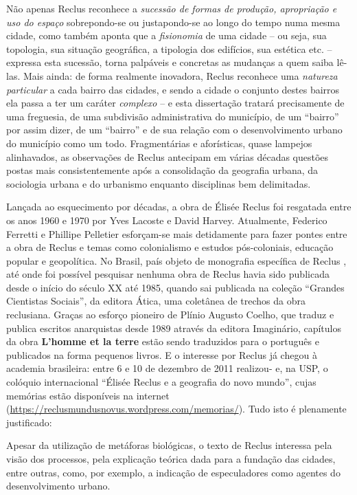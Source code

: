 Não apenas Reclus reconhece a \textit{sucessão de formas de produção, apropriação e uso do espaço} sobrepondo-se ou justapondo-se ao longo do tempo numa mesma cidade, como também aponta que a \textit{fisionomia} de uma cidade -- ou seja, sua topologia, sua situação geográfica, a tipologia dos edifícios, sua estética etc. -- expressa esta sucessão, torna palpáveis e concretas as mudanças a quem saiba lê-las. Mais ainda: de forma realmente inovadora, Reclus reconhece uma \textit{natureza particular} a cada bairro das cidades, e sendo a cidade o conjunto destes bairros ela passa a ter um caráter \textit{complexo} -- e esta dissertação tratará precisamente de uma freguesia, de uma subdivisão administrativa do município, de um ``bairro'' por assim dizer, de um ``bairro'' e de sua relação com o desenvolvimento urbano do município como um todo. Fragmentárias e aforísticas, quase lampejos alinhavados, as observações de Reclus antecipam em várias décadas questões postas mais consistentemente após a consolidação da geografia urbana, da sociologia urbana e do urbanismo enquanto disciplinas bem delimitadas.

Lançada ao esquecimento por décadas, a obra de Élisée Reclus foi resgatada entre os anos 1960 e 1970 por Yves Lacoste e David Harvey. Atualmente, Federico Ferretti e Phillipe Pelletier esforçam-se mais detidamente para fazer pontes entre a obra de Reclus e temas como colonialismo e estudos pós-coloniais, educação popular e geopolítica. No Brasil, país objeto de monografia específica de Reclus \cite{RECLUS1900}, até onde foi possível pesquisar nenhuma obra de Reclus havia sido publicada desde o início do século XX até 1985, quando sai publicada na coleção ``Grandes Cientistas Sociais'', da editora Ática, uma coletânea de trechos da obra reclusiana. Graças ao esforço pioneiro de Plínio Augusto Coelho, que traduz e publica escritos anarquistas desde 1989 através da editora Imaginário, capítulos da obra \textbf{L'homme et la terre }estão sendo traduzidos para o português e publicados na forma pequenos livros. E o interesse por Reclus já chegou à academia brasileira: entre 6 e 10 de dezembro de 2011 realizou- e, na USP, o colóquio internacional ``Élisée Reclus e a geografia do novo mundo'', cujas memórias estão disponíveis na internet (\url{https://reclusmundusnovus.wordpress.com/memorias/}). Tudo isto é plenamente justificado:

\begin{citacao}
Apesar da utilização de metáforas biológicas, o texto de Reclus interessa pela visão dos processos, pela explicação teórica dada para a fundação das cidades, entre outras, como, por exemplo, a indicação de especuladores como agentes do desenvolvimento urbano. \cite[p.~65]{vasconcelos_dois_2012}
\end{citacao}

